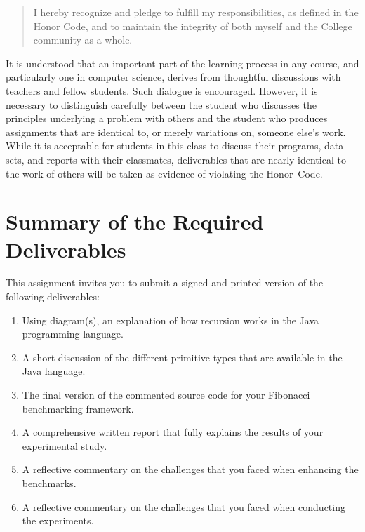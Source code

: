 \vspace*{-.1in}
\begin{quote}
  I hereby recognize and pledge to fulfill my responsibilities, as defined in the Honor Code, and to maintain the
  integrity of both myself and the College community as a whole.
\end{quote}
\vspace*{-.1in}

\noindent It is understood that an important part of the learning process in any course, and particularly one in
computer science, derives from thoughtful discussions with teachers and fellow students.  Such dialogue is encouraged.
However, it is necessary to distinguish carefully between the student who discusses the principles underlying a problem
with others and the student who produces assignments that are identical to, or merely variations on, someone else's
work.  While it is acceptable for students in this class to discuss their programs, data sets, and reports with their
classmates, deliverables that are nearly identical to the work of others will be taken as evidence of violating the
\mbox{Honor Code}.

\section*{Summary of the Required Deliverables}

This assignment invites you to submit a signed and printed version of the following deliverables:

\vspace*{-.1in}
\begin{enumerate}
  \itemsep0pt
  \item Using diagram(s), an explanation of how recursion works in the Java programming language.

  \item A short discussion of the different primitive types that are available in the Java language.

  \item The final version of the commented source code for your Fibonacci benchmarking framework.

  \item A comprehensive written report that fully explains the results of your experimental study.

  \item A reflective commentary on the challenges that you faced when enhancing the benchmarks.

  \item A reflective commentary on the challenges that you faced when conducting the experiments.

\end{enumerate}
\vspace*{-.1in}

